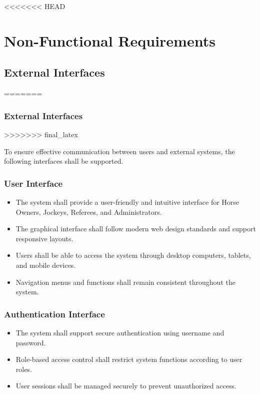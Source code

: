 <<<<<<< HEAD

\section{Non-Functional Requirements}

\subsection{External Interfaces}
=======

\subsubsection{External Interfaces}
>>>>>>> final_latex

To ensure effective communication between users and external systems, the following interfaces shall be supported.

\subsubsection{User Interface}

\begin{itemize}
    \item The system shall provide a user-friendly and intuitive interface for Horse Owners, Jockeys, Referees, and Administrators.
    
    \item The graphical interface shall follow modern web design standards and support responsive layouts.
    
    \item Users shall be able to access the system through desktop computers, tablets, and mobile devices.
    
    \item Navigation menus and functions shall remain consistent throughout the system.
\end{itemize}

\subsubsection{Authentication Interface}

\begin{itemize}
    \item The system shall support secure authentication using username and password.
    
    \item Role-based access control shall restrict system functions according to user roles.
    
    \item User sessions shall be managed securely to prevent unauthorized access.
\end{itemize}

